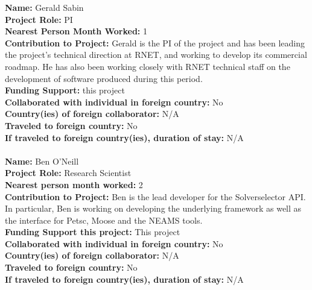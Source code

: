 {\bf Name:} Gerald Sabin \\ 
{\bf Project Role:} PI\\
{\bf Nearest Person Month Worked:} 1\\
{\bf Contribution to Project:} Gerald is the PI of the project and has been leading the project’s technical direction at RNET,   and working  to develop its commercial roadmap. He has also been working closely with RNET technical staff on the development of software produced during this period.\\
{\bf Funding Support:} this project\\
{\bf Collaborated with individual in foreign country:} No\\
{\bf Country(ies) of foreign collaborator:} N/A\\
{\bf Traveled to foreign country:} No\\
{\bf If traveled to foreign country(ies), duration of stay:} N/A\\\\
{\bf Name:} Ben O'Neill \\
{\bf Project Role:} Research Scientist\\
{\bf Nearest person month worked:} 2\\
{\bf Contribution to Project:} Ben is the lead developer for the Solverselector API. In particular, Ben is working on developing the underlying framework as well as the interface for Petsc, Moose and the NEAMS tools.  \\
{\bf Funding Support this project:} This project\\
{\bf Collaborated with individual in foreign country:} No\\
{\bf Country(ies) of foreign collaborator:} N/A\\
{\bf Traveled to foreign country:} No\\
{\bf If traveled to foreign country(ies), duration of stay:} N/A\\\\


